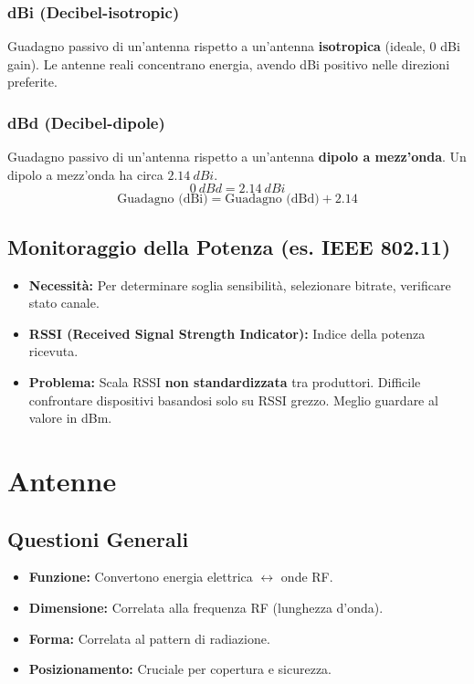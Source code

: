 \subsubsection{dBi (Decibel-isotropic)}
Guadagno passivo di un'antenna rispetto a un'antenna \textbf{isotropica} (ideale, 0 dBi gain). Le antenne reali concentrano energia, avendo dBi positivo nelle direzioni preferite.

\subsubsection{dBd (Decibel-dipole)}
Guadagno passivo di un'antenna rispetto a un'antenna \textbf{dipolo a mezz'onda}.
Un dipolo a mezz'onda ha circa $\SI{2.14}{dBi}$.
\[ \SI{0}{dBd} = \SI{2.14}{dBi} \]
\[ \text{Guadagno (dBi)} = \text{Guadagno (dBd)} + 2.14 \]

\subsection{Monitoraggio della Potenza (es. IEEE 802.11)}
\begin{itemize}
    \item \textbf{Necessità:} Per determinare soglia sensibilità, selezionare bitrate, verificare stato canale.
    \item \textbf{RSSI (Received Signal Strength Indicator):} Indice della potenza ricevuta.
    \item \textbf{Problema:} Scala RSSI \textbf{non standardizzata} tra produttori. Difficile confrontare dispositivi basandosi solo su RSSI grezzo. Meglio guardare al valore in dBm.
\end{itemize}

\section{Antenne}

\subsection{Questioni Generali}
\begin{itemize}
    \item \textbf{Funzione:} Convertono energia elettrica $\leftrightarrow$ onde RF.
    \item \textbf{Dimensione:} Correlata alla frequenza RF (lunghezza d'onda).
    \item \textbf{Forma:} Correlata al pattern di radiazione.
    \item \textbf{Posizionamento:} Cruciale per copertura e sicurezza.
\end{itemize}

